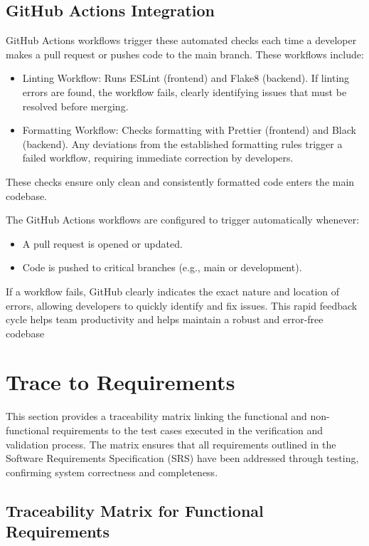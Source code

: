\documentclass[12pt, titlepage]{article}
\begin{document}
\subsection{GitHub Actions Integration}
GitHub Actions workflows trigger these automated checks each time a developer makes a pull request or pushes code to the main branch. These workflows include:
\begin{itemize}
\item Linting Workflow: Runs ESLint (frontend) and Flake8 (backend). If linting errors are found, the workflow fails, clearly identifying issues that must be resolved before merging.
\item Formatting Workflow: Checks formatting with Prettier (frontend) and Black (backend). Any deviations from the established formatting rules trigger a failed workflow, requiring immediate correction by developers.
\end{itemize}

These checks ensure only clean and consistently formatted code enters the main codebase.

The GitHub Actions workflows are configured to trigger automatically whenever:
\begin{itemize}
\item A pull request is opened or updated.
\item Code is pushed to critical branches (e.g., main or development).
\end{itemize}

If a workflow fails, GitHub clearly indicates the exact nature and location of errors, allowing developers to quickly identify and fix issues. This rapid feedback cycle helps team productivity and helps maintain a robust and error-free codebase



		
\section{Trace to Requirements}

This section provides a traceability matrix linking the functional and non-functional requirements to the test cases executed in the verification and validation process. The matrix ensures that all requirements outlined in the Software Requirements Specification (SRS) have been addressed through testing, confirming system correctness and completeness.

\subsection{Traceability Matrix for Functional Requirements}
\end{document}
